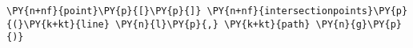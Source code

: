 \begin{Verbatim}[commandchars=\\\{\}]
    \PY{n+nf}{point}\PY{p}{[}\PY{p}{]} \PY{n+nf}{intersectionpoints}\PY{p}{(}\PY{k+kt}{line} \PY{n}{l}\PY{p}{,} \PY{k+kt}{path} \PY{n}{g}\PY{p}{)}
\end{Verbatim}
